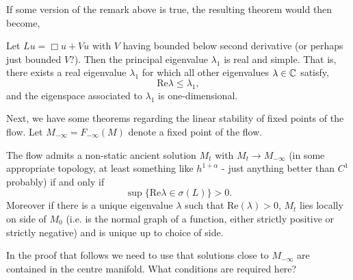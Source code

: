 \documentclass{amsart}
\begin{document}
If some version of the remark above is true, the resulting theorem would then become,
\begin{thm}
Let \(L u = \Box u + V u\) with \(V\) having bounded below second derivative (or perhaps just bounded \(V\)?). Then the principal eigenvalue \(\lambda_1\) is real and simple. That is, there exists a real eigenvalue \(\lambda_1\) for which all other eigenvalues \(\lambda \in \mathbb{C}\) satisfy,
\[
\text{Re} \lambda \leq \lambda_1,
\]
and the eigenspace associated to \(\lambda_1\) is one-dimensional.
\end{thm}

Next, we have some theorems regarding the linear stability of fixed points of the flow. Let \(M_{-\infty} = F_{-\infty}(M)\) denote a fixed point of the flow.

\begin{thm}
The flow admits a non-static ancient solution \(M_t\) with \(M_t \to M_{-\infty}\) (in some appropriate topology, at least something like \(h^{1+\alpha}\) - just anything better than \(C^1\) probably) if and only if
\[
\sup \{\text{Re}\lambda \in \sigma(L)\} > 0.
\]
Moreover if there is a unique eigenvalue \(\lambda\) such that \(\text{Re}(\lambda) > 0\), \(M_t\) lies locally on side of \(M_0\) (i.e. is the normal graph of a function, either strictly positive or strictly negative) and is unique up to choice of side.
\end{thm}

\begin{rem}
In the proof that follows we need to use that solutions close to \(M_{-\infty}\) are contained in the centre manifold. What conditions are required here?
\end{rem}
\end{document}
